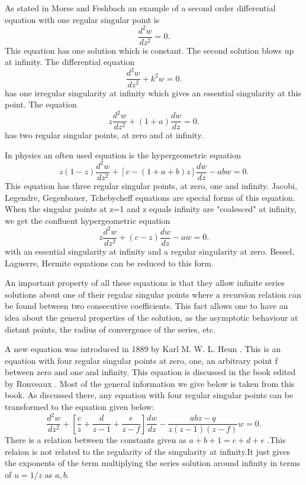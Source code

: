 \documentclass{article}
\begin{document}
\noindent As stated in Morse and Feshbach \cite{Morse1} an example
of a second order differential equation with one regular singular
point is
\begin{equation}
\frac {d^{2}w}{dz^{2}} = 0 .
\end{equation}%
\noindent This equation has one solution which is constant. The
second solution blows up at infinity. The differential equation
\begin{equation}
\frac {d^{2}w}{dz^{2}} +k^{2} w= 0 .
\end{equation}%
has one irregular singularity at infinity which gives an essential
singularity at this point. The equation
\begin{equation}
z \frac {d^{2}w}{dz^{2}} + (1+a) \frac {dw}{dz}= 0 .
\end{equation}%
has two regular singular points, at zero and at infinity.

\noindent In physics an often used equation is the hypergeometric
equation
\begin{equation}
z(1-z)\frac {d^{2}w}{dz^{2}} + [c - (1+a+b)z] \frac{dw}{dz}-ab w=
0 .
\end{equation}%
This equation has three regular singular points, at zero, one and
infinity. Jacobi, Legendre, Gegenbauer, Tchebycheff equations are
special forms of this equation. When the singular points at z=1
and z equals infinity are "coalesced"  at infinity, we get the
confluent hypergeometric equation
\begin{equation}
z\frac {d^{2}w}{dz^{2}} + (c - z) \frac{dw}{dz} - a w = 0 .
\end{equation}%
with an essential singularity at infinity and a regular singularity
at zero. Bessel, Laguerre, Hermite equations can be reduced to
this form.

\noindent An important property of all these equations is that
they allow infinite series solutions about one of their regular
singular points where a recursion relation can be found between
two consecutive coefficients. This fact allows  one to have an
idea about the general properties of the solution, as the asymptotic
behaviour at distant points, the radius of convergence of the
series, etc.


\noindent A new equation was introduced in 1889 by Karl M. W. L.
Heun \cite{Heun}. This is an equation with four regular singular
points at zero, one, an arbitrary point f between zero and one and
infinity. This equation is discussed in the book edited by
Ronveaux \cite{Ronveaux}. Most of the general information we give
below is taken from this book. As discussed there, any equation
with four regular singular points can be transformed to the
equation given below:
\begin{equation}
\frac {d^{2}w}{dz^{2}} + [\frac {c}{z} + \frac{ d}{z-1} + \frac{
e}{z-f}] \frac{dw}{dz} - \frac{abz-q}{z(z-1)(z-f)}w = 0 .
\end{equation}%
There is a relation between the constants given as $ a+b+1 = c+d+e
$ .This relaion is not related to the regularity of the singularity at infinity.It just gives the exponents of the term
multiplying the series solution around infinity in terms of $u=1/z$
as $a,b$.
\end{document}
